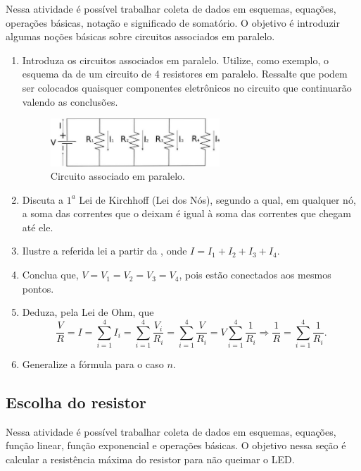 \documentclass{textolivre-html}
\begin{document}
Nessa atividade é possível trabalhar coleta de dados em esquemas, equações,
operações básicas, notação e significado de somatório. O objetivo é introduzir
algumas noções básicas sobre circuitos associados em paralelo.


\begin{enumerate}
\item Introduza os circuitos associados em paralelo. Utilize, como exemplo, o
esquema da  de um circuito de 4 resistores em paralelo. Ressalte que
podem ser colocados quaisquer componentes eletrônicos no circuito que
continuarão valendo as conclusões.

\begin{figure}[h!]
\centering
\includegraphics[width=0.6\textwidth]{figure-30.pdf}
\caption{Circuito associado em paralelo.}
\label{fig20}
\end{figure}

\item Discuta a $1^a$ Lei de Kirchhoff (Lei dos Nós), segundo a qual, em qualquer
nó, a soma das correntes que o deixam é igual à soma das correntes que chegam
até ele.

\item Ilustre a referida lei a partir da , onde $I=I_1+I_2+I_3+I_4$.
\item Conclua que, $V=V_1=V_2=V_3=V_4$, pois estão conectados aos mesmos pontos.
\item Deduza, pela Lei de Ohm, que
\begin{equation*}
\frac{V}{R} = I = \sum_{i=1}^{4} I_i = \sum_{i=1}^{4} \frac{V_i}{R_i} = \sum_{i=1}^{4} \frac{V}{R_i} = V \sum_{i=1}^{4} \frac{1}{R_i} \Rightarrow \frac{1}{R} = \sum_{i=1}^{4} \frac{1}{R_i} .
\end{equation*}
\item Generalize a fórmula para o caso $n$.
\end{enumerate}


\subsection{Escolha do resistor}\label{sec-escolha-R}
Nessa atividade é possível trabalhar coleta de dados em esquemas, equações,
função linear, função exponencial e operações básicas. O objetivo nessa seção é
calcular a resistência máxima do resistor para não queimar o LED.
\end{document}
